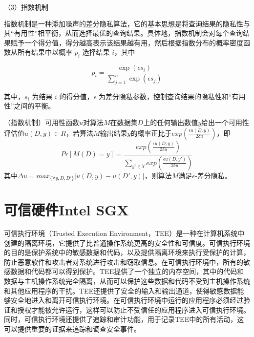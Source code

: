 %
%

（3）指数机制

指数机制是一种添加噪声的差分隐私算法，它的基本思想是将查询结果的隐私性与其“有用性”相平衡，从而选择最优的查询结果。具体地，指数机制会对每个查询结果赋予一个得分值，得分越高表示该结果越有用，然后根据指数分布的概率密度函数从所有结果中以概率 $p_i$ 选择结果 $i$，其中

$$ p_i = \frac{\exp(\epsilon s_i)}{\sum_{j=1}^{n}\exp(\epsilon s_j)} $$

其中，$s_i$ 为结果 $i$ 的得分值，$\epsilon$ 为差分隐私参数，控制查询结果的隐私性和“有用性”之间的平衡。


\begin{theorem}
	（指数机制\cite{mcsherry2007mechanism}）可用性函数$u$对算法$M$在数据集$D$上的任何输出数值$y$给出一个可用性评估值$u(D,y)\in R$，若算法$M$输出结果$y$的概率正比于$exp(\frac{\epsilon u(D,y)}{2\delta u})$，即
	\begin{equation}
		Pr[M(D)=y]=\frac{exp(\frac{\epsilon u(D,y)}{2\delta u})}{\sum_{y'\in Y}exp(\frac{\epsilon u(D,y')}{2\delta u})}
	\end{equation}
其中$\Delta u = max_{\{\forall y, D, D'\}}|u(D,y)-u(D',y)|$，则算法$M$满足$\epsilon$-差分隐私。
\end{theorem}

\section{可信硬件Intel SGX}


可信执行环境（Trusted Execution Environment，TEE）是一种在计算机系统中创建的隔离环境，它提供了比普通操作系统更高的安全性和可信度。可信执行环境的目的是保护系统中的敏感数据和代码，以及提供隔离环境来执行受保护的计算，防止恶意软件和攻击者对系统进行攻击和窃取信息。在可信执行环境中，所有的敏感数据和代码都可以得到保护。TEE提供了一个独立的内存空间，其中的代码和数据与主机操作系统完全隔离，从而可以保护这些数据和代码不受到主机操作系统和其他应用程序的干扰。TEE还提供了安全的输入和输出通道，使得敏感数据能够安全地进入和离开可信执行环境。在可信执行环境中运行的应用程序必须经过验证和授权才能被允许运行，这样可以防止不受信任的应用程序进入可信执行环境。同时，可信执行环境还提供了追踪和审计功能，用于记录TEE中的所有活动，这可以提供重要的证据来追踪和调查安全事件。

